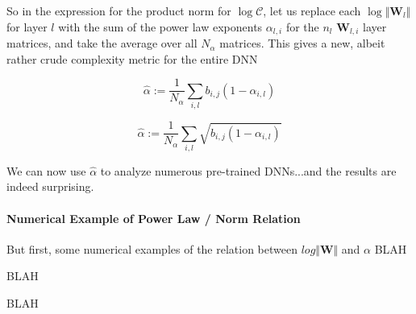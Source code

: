 So in the expression for the product norm for $\log\mathcal{C}$, let us replace each $\log\Vert\mathbf{W}_{l}\Vert$ for layer $l$ with the sum of the power law exponents $\alpha_{l,i}$ for the $n{_l}$ $\mathbf{W}_{l,i}$ layer matrices, and take the average over all $N_{\alpha}$  matrices.  This gives a new, albeit rather crude complexity metric for the entire DNN


$$\hat{\alpha}:=\dfrac{1}{N_{\alpha}}\sum_{i,l}b_{i,j}(1-\alpha_{i,l})$$


$$\hat{\alpha}:=\dfrac{1}{N_{\alpha}}\sum_{i,l}\sqrt{b_{i,j}(1-\alpha_{i,l})}$$


We can now use $\hat{\alpha}$ to analyze numerous pre-trained DNNs...and the results are indeed surprising.

\paragraph{Numerical Example of Power Law / Norm Relation}

But first, some numerical examples of the relation between $log\Vert\mathbf{W}\Vert$ and $\alpha$
BLAH

BLAH

BLAH


